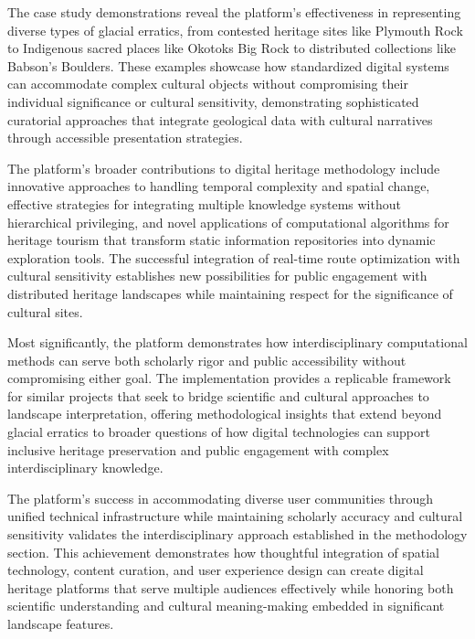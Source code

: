 The case study demonstrations reveal the platform's effectiveness in representing diverse types of glacial erratics, from contested heritage sites like Plymouth Rock to Indigenous sacred places like Okotoks Big Rock to distributed collections like Babson's Boulders. These examples showcase how standardized digital systems can accommodate complex cultural objects without compromising their individual significance or cultural sensitivity, demonstrating sophisticated curatorial approaches that integrate geological data with cultural narratives through accessible presentation strategies.

The platform's broader contributions to digital heritage methodology include innovative approaches to handling temporal complexity and spatial change, effective strategies for integrating multiple knowledge systems without hierarchical privileging, and novel applications of computational algorithms for heritage tourism that transform static information repositories into dynamic exploration tools. The successful integration of real-time route optimization with cultural sensitivity establishes new possibilities for public engagement with distributed heritage landscapes while maintaining respect for the significance of cultural sites.

Most significantly, the platform demonstrates how interdisciplinary computational methods can serve both scholarly rigor and public accessibility without compromising either goal. The implementation provides a replicable framework for similar projects that seek to bridge scientific and cultural approaches to landscape interpretation, offering methodological insights that extend beyond glacial erratics to broader questions of how digital technologies can support inclusive heritage preservation and public engagement with complex interdisciplinary knowledge.

The platform's success in accommodating diverse user communities through unified technical infrastructure while maintaining scholarly accuracy and cultural sensitivity validates the interdisciplinary approach established in the methodology section. This achievement demonstrates how thoughtful integration of spatial technology, content curation, and user experience design can create digital heritage platforms that serve multiple audiences effectively while honoring both scientific understanding and cultural meaning-making embedded in significant landscape features.
